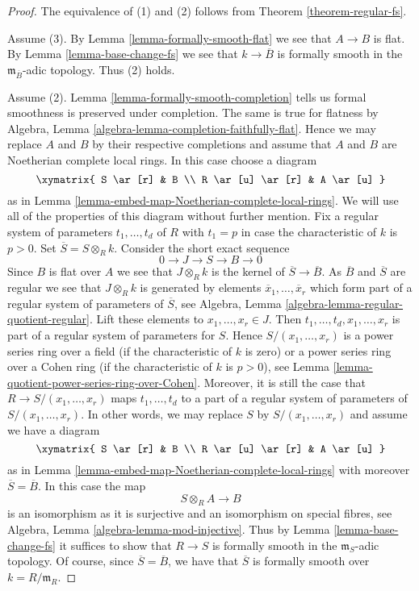 \begin{proof}
The equivalence of (1) and (2) follows from Theorem \ref{theorem-regular-fs}.

\medskip\noindent
Assume (3). By Lemma \ref{lemma-formally-smooth-flat} we see that
$A \to B$ is flat. By Lemma \ref{lemma-base-change-fs} we see that
$k \to \overline{B}$ is formally smooth in the
$\mathfrak m_{\overline{B}}$-adic topology. Thus (2) holds.

\medskip\noindent
Assume (2). Lemma \ref{lemma-formally-smooth-completion}
tells us formal smoothness is preserved under completion. The same is true
for flatness by Algebra, Lemma \ref{algebra-lemma-completion-faithfully-flat}.
Hence we may replace $A$ and $B$ by their respective completions and
assume that $A$ and $B$ are Noetherian complete local rings.
In this case choose a diagram
$$
\xymatrix{
S \ar[r] & B \\
R \ar[u] \ar[r] & A \ar[u]
}
$$
as in Lemma \ref{lemma-embed-map-Noetherian-complete-local-rings}.
We will use all of the properties of this diagram without further mention.
Fix a regular system of parameters $t_1, \ldots, t_d$ of $R$
with $t_1 = p$ in case the characteristic of $k$ is $p > 0$.
Set $\overline{S} = S \otimes_R k$. Consider the short exact sequence
$$
0 \to J \to S \to B \to 0
$$
Since $B$ is flat over $A$ we see that $J \otimes_R k$ is the kernel
of $\overline{S} \to \overline{B}$. As $\overline{B}$ and $\overline{S}$
are regular we see that $J \otimes_R k$ is generated by elements
$\overline{x}_1, \ldots, \overline{x}_r$ which form part of a regular
system of parameters of $\overline{S}$, see
Algebra, Lemma \ref{algebra-lemma-regular-quotient-regular}.
Lift these elements to $x_1, \ldots, x_r \in J$. Then
$t_1, \ldots, t_d, x_1, \ldots, x_r$ is part of a regular system of
parameters for $S$. Hence $S/(x_1, \ldots, x_r)$ is a power
series ring over a field (if the characteristic of $k$ is zero)
or a power series ring over a Cohen ring (if the characteristic of
$k$ is $p > 0$), see
Lemma \ref{lemma-quotient-power-series-ring-over-Cohen}.
Moreover, it is still the case that $R \to S/(x_1, \ldots, x_r)$
maps $t_1, \ldots, t_d$ to a part of a regular system of parameters
of $S/(x_1, \ldots, x_r)$. In other words, we may replace $S$ by
$S/(x_1, \ldots, x_r)$ and assume we have a diagram
$$
\xymatrix{
S \ar[r] & B \\
R \ar[u] \ar[r] & A \ar[u]
}
$$
as in Lemma \ref{lemma-embed-map-Noetherian-complete-local-rings}
with moreover $\overline{S} = \overline{B}$. In this case the map
$$
S \otimes_R A \longrightarrow B
$$
is an isomorphism as it is surjective and an isomorphism on special
fibres, see Algebra, Lemma \ref{algebra-lemma-mod-injective}. Thus by
Lemma \ref{lemma-base-change-fs}
it suffices to show that $R \to S$ is formally
smooth in the $\mathfrak m_S$-adic topology.
Of course, since $\overline{S} = \overline{B}$, we have
that $\overline{S}$ is formally smooth over $k = R/\mathfrak m_R$.


\end{proof}
